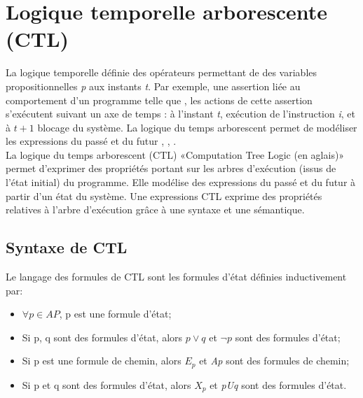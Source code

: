 \section{Logique temporelle arborescente (CTL)}
La logique temporelle définie des opérateurs permettant de  des variables propositionnelles \emph{p} aux instants \emph{t}. Par exemple, une assertion liée au comportement d'un programme telle que , les actions de cette assertion s'exécutent suivant un axe de temps : à l'instant \emph{t}, exécution de l'instruction \emph{i}, et à \emph{$t + 1$} blocage du système. La logique du temps arborescent permet de modéliser les expressions du passé et du futur \citep{Bakker1983}, \citep{Clarke1981}, \citep{Emerson1983}.\\

La logique du temps arborescent (CTL) «Computation Tree Logic (en aglais)» permet d'exprimer des propriétés portant sur les arbres d'exécution (issus de l'état initial) du programme. Elle modélise des expressions du passé et du futur à partir d'un état du système. Une expressions CTL exprime des propriétés relatives à l'arbre d'exécution grâce à une syntaxe et une sémantique.

\subsection{Syntaxe de CTL}
Le langage des formules de CTL sont les formules d'état définies inductivement par:
\begin{itemize}
	\item  $ \forall p \in AP$, p est une formule d'état;
	\item  Si p, q sont des formules d'état, alors $p \vee q$ et $\neg p$ sont des formules d'état;
	\item Si p est une formule de chemin, alors \emph{$E_p$} et \emph{Ap} sont des formules de chemin;
	\item Si p et q sont des formules d'état, alors \emph{$X_p$} et \emph{pUq} sont des formules d'état.
\end{itemize}

